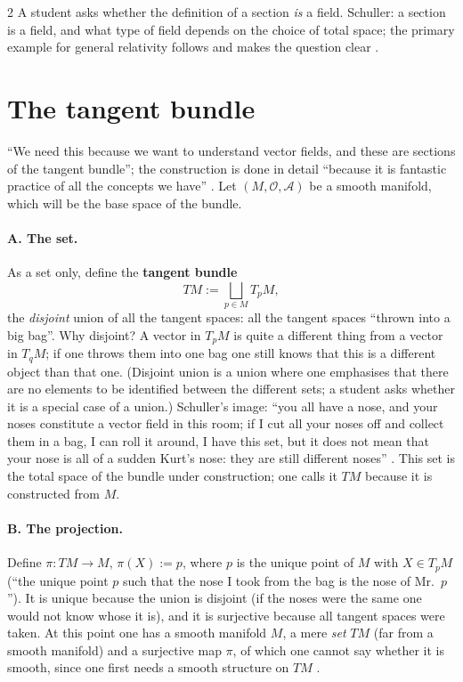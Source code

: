 \begin{paracol}{2}
A student asks whether the definition of a section \emph{is} a field. Schuller: a section is a field, and what type of field depends on the choice of total space; the primary example for general relativity follows and makes the question clear .

\section{The tangent bundle}\label{sec:c06-tangent}

``We need this because we want to understand vector fields, and these are sections of the tangent bundle''; the construction is done in detail ``because it is fantastic practice of all the concepts we have'' . Let $(M,\mathcal O,\mathcal A)$ be a smooth manifold, which will be the base space of the bundle.

\paragraph{A. The set.} As a set only, define the \textbf{tangent bundle}
\[
  TM:=\bigsqcup_{p\in M}T_pM,
\]
the \emph{disjoint} union of all the tangent spaces: all the tangent spaces ``thrown into a big bag''. Why disjoint? A vector in $T_pM$ is quite a different thing from a vector in $T_qM$; if one throws them into one bag one still knows that this is a different object than that one. (Disjoint union is a union where one emphasises that there are no elements to be identified between the different sets; a student asks whether it is a special case of a union.)
Schuller's image: ``you all have a nose, and your noses constitute a vector field in this room; if I cut all your noses off and collect them in a bag, I can roll it around, I have this set, but it does not mean that your nose is all of a sudden Kurt's nose: they are still different noses''
.
This set is the total space of the bundle under construction; one calls it $TM$ because it is constructed from $M$.

\paragraph{B. The projection.} Define $\pi\colon TM\to M$, $\pi(X):=p$, where $p$ is the unique point of $M$ with $X\in T_pM$ (``the unique point $p$ such that the nose I took from the bag is the nose of Mr.\ $p$''). It is unique because the union is disjoint (if the noses were the same one would not know whose it is), and it is surjective because all tangent spaces were taken.
At this point one has a smooth manifold $M$, a mere \emph{set} $TM$ (far from a smooth manifold) and a surjective map $\pi$, of which one cannot say whether it is smooth, since one first needs a smooth structure on $TM$ .


\end{paracol}
